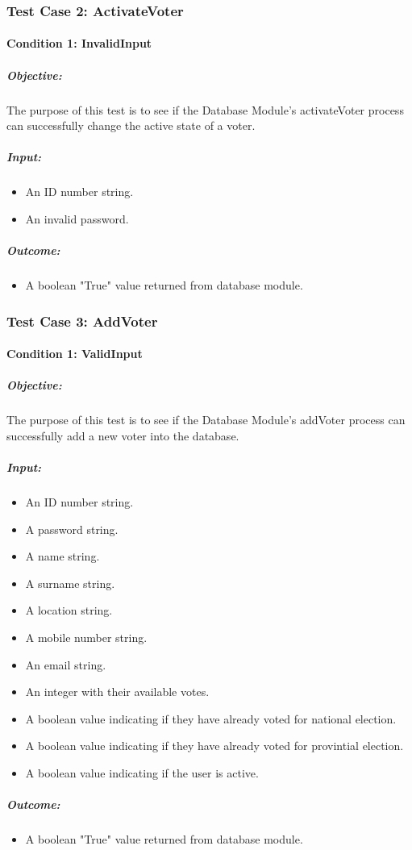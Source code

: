 \documentclass[11pt]{article}
\begin{document}
		\subsubsection{Test Case 2: ActivateVoter}
		\paragraph{Condition 1: InvalidInput}	
		\subparagraph{Objective:}
		The purpose of this test is to see if the Database Module's activateVoter process can successfully change the active state of a voter.
		\subparagraph{Input:}
		\begin{itemize}
			\item An ID number string.
			\item An invalid password.
		\end{itemize}
		\subparagraph{Outcome:}
		\begin{itemize}
			\item A boolean "True" value returned from database module.
		\end{itemize}
		
		\subsubsection{Test Case 3: AddVoter}
		\paragraph{Condition 1: ValidInput}	
		\subparagraph{Objective:}
		The purpose of this test is to see if the Database Module's addVoter process can successfully add a new voter into the database.
		\subparagraph{Input:}
		\begin{itemize}
			\item An ID number string.
			\item A password string.
			\item A name string.
			\item A surname string.
			\item A location string.
			\item A mobile number string.
			\item An email string.
			\item An integer with their available votes.
			\item A boolean value indicating if they have already voted for national election.
			\item A boolean value indicating if they have already voted for provintial election.
			\item A boolean value indicating if the user is active.
		\end{itemize}
		\subparagraph{Outcome:}
		\begin{itemize}
			\item A boolean "True" value returned from database module.
		\end{itemize}
\end{document}

